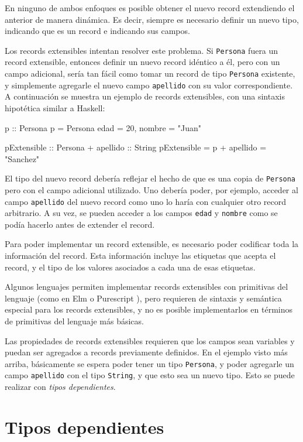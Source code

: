 En ninguno de ambos enfoques es posible obtener el nuevo record extendiendo el anterior de manera dinámica. Es decir, siempre es necesario definir un nuevo tipo, indicando que es un record e indicando sus campos.

Los records extensibles intentan resolver este problema. Si \texttt{Persona} fuera un record extensible, entonces definir un nuevo record idéntico a él, pero con un campo adicional, sería tan fácil como tomar un record de tipo \texttt{Persona} existente, y simplemente agregarle el nuevo campo \texttt{apellido} con su valor correspondiente. A continuación se muestra un ejemplo de records extensibles, con una sintaxis hipotética similar a Haskell:

\begin{code}
p :: Persona
p = Persona { edad = 20, nombre = "Juan" }

pExtensible :: Persona + { apellido :: String }
pExtensible = p + { apellido = "Sanchez" }
\end{code}

El tipo del nuevo record debería reflejar el hecho de que es una copia de \texttt{Persona} pero con el campo adicional utilizado. Uno debería poder, por ejemplo, acceder al campo \texttt{apellido} del nuevo record como uno lo haría con cualquier otro record arbitrario. A su vez, se pueden acceder a los campos \texttt{edad} y \texttt{nombre} como se podía hacerlo antes de extender el record.

Para poder implementar un record extensible, es necesario poder codificar toda la información del record. Esta información incluye las etiquetas que acepta el record, y el tipo de los valores asociados a cada una de esas etiquetas.

Algunos lenguajes permiten implementar records extensibles con primitivas del lenguaje (como en Elm \cite{ElmRecords} o Purescript \cite{PurescriptRecords}), pero requieren de sintaxis y semántica especial para los records extensibles, y no es posible implementarlos en términos de primitivas del lenguaje más básicas.

Las propiedades de records extensibles requieren que los campos sean variables y puedan ser agregados a records previamente definidos. En el ejemplo visto más arriba, básicamente se espera poder tener un tipo \texttt{Persona}, y poder agregarle un campo \texttt{apellido} con el tipo \texttt{String}, y que esto sea un nuevo tipo. Esto se puede realizar con \textit{tipos dependientes}.

\section{Tipos dependientes}

